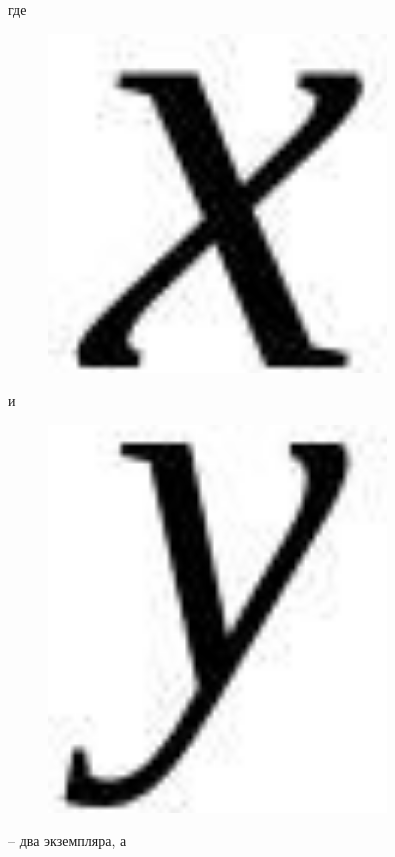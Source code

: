где \begin{figure}[H]
	\centering
	\includegraphics[width=0.8\textwidth]{assets/98}
	\caption*{}
\end{figure} и
\begin{figure}[H]
	\centering
	\includegraphics[width=0.8\textwidth]{assets/99}
	\caption*{}
\end{figure} -- два экземпляра, а
